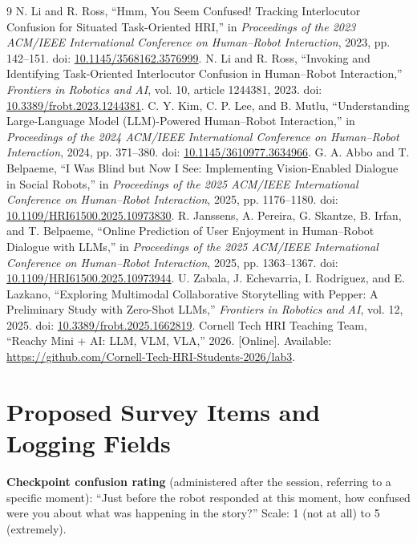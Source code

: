 \documentclass[conference]{IEEEtran}
\begin{document}
\begin{thebibliography}{9}
 N. Li and R. Ross, ``Hmm, You Seem Confused! Tracking Interlocutor Confusion for Situated Task-Oriented HRI,'' in \emph{Proceedings of the 2023 ACM/IEEE International Conference on Human--Robot Interaction}, 2023, pp. 142--151. doi: \href{https://doi.org/10.1145/3568162.3576999}{10.1145/3568162.3576999}.
 N. Li and R. Ross, ``Invoking and Identifying Task-Oriented Interlocutor Confusion in Human--Robot Interaction,'' \emph{Frontiers in Robotics and AI}, vol. 10, article 1244381, 2023. doi: \href{https://doi.org/10.3389/frobt.2023.1244381}{10.3389/frobt.2023.1244381}.
 C. Y. Kim, C. P. Lee, and B. Mutlu, ``Understanding Large-Language Model (LLM)-Powered Human--Robot Interaction,'' in \emph{Proceedings of the 2024 ACM/IEEE International Conference on Human--Robot Interaction}, 2024, pp. 371--380. doi: \href{https://doi.org/10.1145/3610977.3634966}{10.1145/3610977.3634966}.
 G. A. Abbo and T. Belpaeme, ``I Was Blind but Now I See: Implementing Vision-Enabled Dialogue in Social Robots,'' in \emph{Proceedings of the 2025 ACM/IEEE International Conference on Human--Robot Interaction}, 2025, pp. 1176--1180. doi: \href{https://doi.org/10.1109/HRI61500.2025.10973830}{10.1109/HRI61500.2025.10973830}.
 R. Janssens, A. Pereira, G. Skantze, B. Irfan, and T. Belpaeme, ``Online Prediction of User Enjoyment in Human--Robot Dialogue with LLMs,'' in \emph{Proceedings of the 2025 ACM/IEEE International Conference on Human--Robot Interaction}, 2025, pp. 1363--1367. doi: \href{https://doi.org/10.1109/HRI61500.2025.10973944}{10.1109/HRI61500.2025.10973944}.
 U. Zabala, J. Echevarria, I. Rodriguez, and E. Lazkano, ``Exploring Multimodal Collaborative Storytelling with Pepper: A Preliminary Study with Zero-Shot LLMs,'' \emph{Frontiers in Robotics and AI}, vol. 12, 2025. doi: \href{https://doi.org/10.3389/frobt.2025.1662819}{10.3389/frobt.2025.1662819}.
 Cornell Tech HRI Teaching Team, ``Reachy Mini + AI: LLM, VLM, VLA,'' 2026. [Online]. Available: \url{https://github.com/Cornell-Tech-HRI-Students-2026/lab3}.
\end{thebibliography}

\appendix
\section{Proposed Survey Items and Logging Fields}
\noindent\textbf{Checkpoint confusion rating} (administered after the session, referring to a specific moment): ``Just before the robot responded at this moment, how confused were you about what was happening in the story?'' Scale: 1 (not at all) to 5 (extremely).
\end{document}
